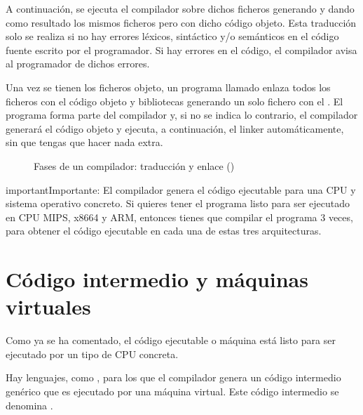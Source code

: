 \documentclass[letterpaper,10pt,spanish]{sphinxmanual}
\begin{document}
\sphinxAtStartPar
A continuación, se ejecuta el compilador sobre dichos ficheros generando  y dando como resultado los mismos ficheros pero con dicho código objeto. Esta traducción solo se realiza si no hay errores léxicos, sintáctico y/o semánticos en el código fuente escrito por el programador. Si hay errores en el código, el compilador avisa al programador de dichos errores.

\sphinxAtStartPar
Una vez se tienen los ficheros objeto, un programa llamado  enlaza todos los ficheros con el código objeto y bibliotecas generando un solo fichero con el . El programa  forma parte del compilador y, si no se indica lo contrario, el compilador generará el código objeto y ejecuta, a continuación, el linker automáticamente, sin que tengas que hacer nada extra.

\begin{figure}[htbp]
\centering
\capstart

\noindent{}
\caption{Fases de un compilador: traducción y enlace ()}\label{\detokenize{obtencion_del_codigo:id5}}\end{figure}

\begin{sphinxadmonition}{important}{Importante:}
\sphinxAtStartPar
El compilador genera el código ejecutable para una CPU y sistema operativo concreto. Si quieres tener el programa listo para ser ejecutado en CPU MIPS, x86\sphinxhyphen{}64 y ARM, entonces tienes que compilar el programa 3 veces, para obtener el código ejecutable en cada una de estas tres arquitecturas.
\end{sphinxadmonition}


\section{Código intermedio y máquinas virtuales}
\label{\detokenize{obtencion_del_codigo:codigo-intermedio-y-maquinas-virtuales}}
\sphinxAtStartPar
Como ya se ha comentado, el código ejecutable o máquina está listo para ser ejecutado por un tipo de CPU concreta.

\sphinxAtStartPar
Hay lenguajes, como , para los que el compilador genera un código intermedio genérico que es ejecutado por una máquina virtual. Este código intermedio se denomina .
\end{document}
